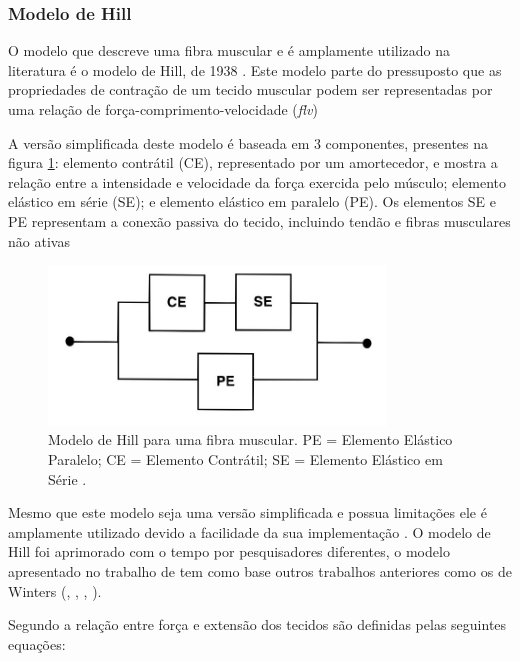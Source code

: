 \subsubsection{Modelo de Hill}
O modelo que descreve uma fibra muscular e é amplamente utilizado na literatura é o modelo de Hill, de 1938 \cite{hill1938heat}. Este modelo parte do pressuposto que as propriedades de contração de um tecido muscular podem ser representadas por uma relação de força-comprimento-velocidade (\textit{flv}) 

A versão simplificada deste modelo é baseada em 3 componentes, presentes na figura \ref{hillmodel}: elemento contrátil (CE), representado por um amortecedor, e mostra a relação entre a intensidade e velocidade da força exercida pelo músculo; elemento elástico em série (SE); e elemento elástico em paralelo (PE). Os elementos SE e PE representam a conexão passiva do tecido, incluindo tendão e fibras musculares não ativas \cite{rosen1999performances}

\begin{figure}[H]
\centering
\includegraphics[width = 0.8\textwidth]{img/Rosen1999.JPG}
\caption[Modelo de Hill para uma fibra muscular]{Modelo de Hill para uma fibra muscular. PE = Elemento Elástico Paralelo; CE = Elemento Contrátil; SE = Elemento Elástico em Série \cite{rosen1999performances}.}
\label{hillmodel}
\end{figure}

Mesmo que este modelo seja uma versão simplificada e possua limitações ele é amplamente utilizado devido a facilidade da sua implementação \cite{rosen1999performances}. O modelo de Hill foi aprimorado com o tempo por pesquisadores diferentes, o modelo apresentado no trabalho de \cite{rosen1999performances} tem como base outros trabalhos anteriores como os de Winters (\cite{winters1993effect}, \cite{winters1985task}, \cite{winters1987biomechanical}, \cite{winters1988estimated}). 

Segundo \cite{rosen1999performances} a relação entre força e extensão dos tecidos são definidas pelas seguintes equações:

